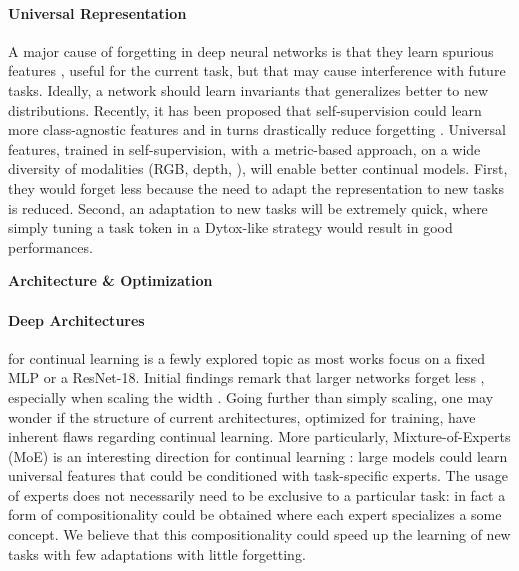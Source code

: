 \paragraph{Universal Representation} A major cause of forgetting in deep neural networks is that
they learn spurious features \citep{lesort2022spuriousfeatures}, useful for the current task, but
that may cause interference with future tasks. Ideally, a network should learn invariants
\citep{arjovsky2019irm,rame2021fishr} that generalizes better to new distributions. Recently, it has
been proposed that self-supervision could learn more class-agnostic features and in turns
drastically reduce forgetting \citep{gallardo2021selfsupcontinual}. Universal
features, trained in self-supervision, with a metric-based approach, on a wide diversity of
modalities (RGB, depth, \etc), will enable better continual models. First, they would forget less
because the need to adapt the representation to new tasks is reduced. Second, an adaptation to new
tasks will be extremely quick, where simply tuning a task token in a Dytox-like strategy would
result in good performances.

\vspace{2em}
\noindent\large{\textbf{Architecture \& Optimization}}

\paragraph{Deep Architectures} for continual learning is a fewly explored topic as most works focus
on a fixed MLP or a ResNet-18. Initial findings remark that larger networks forget less
\citep{ramasesh2022scalecontinual}, especially when scaling the width
\citep{mirzadeh2022widecontinualnetworks}. Going further than simply scaling, one may wonder if the
structure of current architectures, optimized for \iid training, have inherent flaws regarding
continual learning. More particularly, Mixture-of-Experts (MoE) is an interesting direction for
continual learning \citep{caccia2022anytimelearning}: large models could learn universal features
that could be conditioned with task-specific experts. The usage of experts does not necessarily need
to be exclusive to a particular task: in fact a form of compositionality could be obtained where
each expert specializes a some concept. We believe that this compositionality could speed up the
learning of new tasks with few adaptations with little forgetting.

